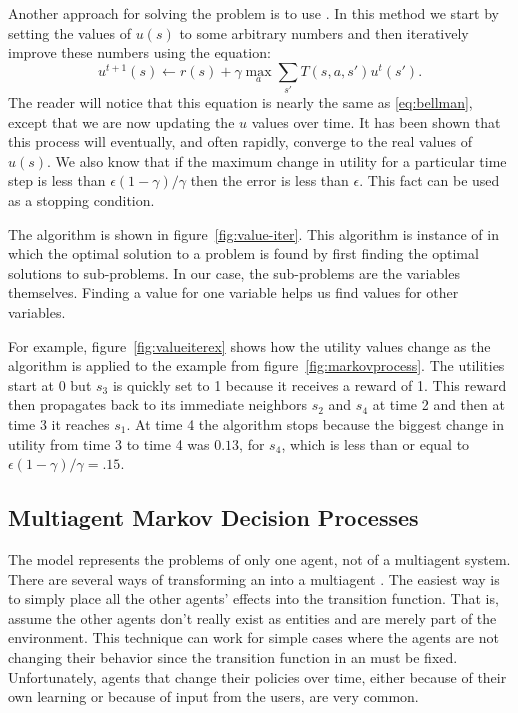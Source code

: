 Another approach for solving the problem is to use . In this method we start by setting the values of $u(s)$
to some arbitrary numbers and then iteratively improve these numbers
using the  equation:
\begin{equation}
  \label{eq:bellman-update}
  u^{t+1}(s) \gets r(s) + \gamma \max_a \sum_{s'}T(s,a,s')u^t(s').
\end{equation}
The reader will notice that this equation is nearly the same as
\eqref{eq:bellman}, except that we are now updating the $u$ values
over time. It has been shown that this process will eventually, and
often rapidly, converge to the real values of $u(s)$. We also know
that if the maximum change in utility for a particular time step is
less than $\epsilon(1-\gamma)/\gamma$ then the error is less than
$\epsilon$.  This fact can be used as a stopping condition.

The  algorithm is shown in
figure~\ref{fig:value-iter}. This algorithm is instance of  in which the optimal solution to a problem is found by
first finding the optimal solutions to sub-problems. In our case, the
sub-problems are the variables themselves. Finding a value for one
variable helps us find values for other variables.



For example, figure~\ref{fig:valueiterex} shows how the utility values
change as the  algorithm is applied to the
example from figure~\ref{fig:markovprocess}. The utilities start at 0
but $s_3$ is quickly set to 1 because it receives a reward of 1.  This
reward then propagates back to its immediate neighbors $s_2$ and $s_4$
at time 2 and then at time 3 it reaches $s_1$. At time 4 the algorithm
stops because the biggest change in utility from time 3 to time 4 was
$0.13$, for $s_4$, which is less than or equal to
$\epsilon(1-\gamma)/\gamma = .15$.


\subsection{Multiagent Markov Decision Processes}
\label{sec:mult-mark-decis}

The  model represents the problems of only one agent, not of
a multiagent system. There are several ways of transforming an
 into a multiagent . The easiest way is to simply
place all the other agents' effects into the transition function. That
is, assume the other agents don't really exist as entities and are
merely part of the environment.  This technique can work for simple
cases where the agents are not changing their behavior since the
transition function in an  must be fixed. Unfortunately,
agents that change their policies over time, either because of their
own learning or because of input from the users, are very common.

